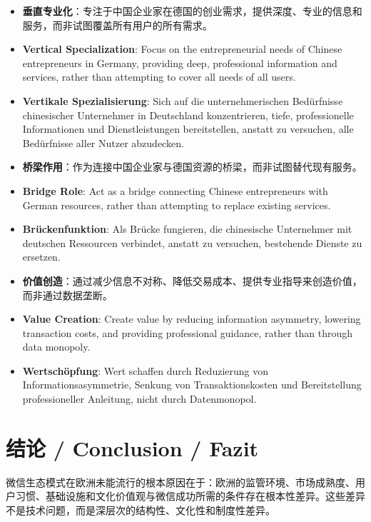 \documentclass[11pt,a4paper]{article}
\begin{document}
\begin{itemize}
    \item \textbf{垂直专业化}：专注于中国企业家在德国的创业需求，提供深度、专业的信息和服务，而非试图覆盖所有用户的所有需求。
    \item \textbf{Vertical Specialization}: Focus on the entrepreneurial needs of Chinese entrepreneurs in Germany, providing deep, professional information and services, rather than attempting to cover all needs of all users.
    \item \textbf{Vertikale Spezialisierung}: Sich auf die unternehmerischen Bedürfnisse chinesischer Unternehmer in Deutschland konzentrieren, tiefe, professionelle Informationen und Dienstleistungen bereitstellen, anstatt zu versuchen, alle Bedürfnisse aller Nutzer abzudecken.
    
    \item \textbf{桥梁作用}：作为连接中国企业家与德国资源的桥梁，而非试图替代现有服务。
    \item \textbf{Bridge Role}: Act as a bridge connecting Chinese entrepreneurs with German resources, rather than attempting to replace existing services.
    \item \textbf{Brückenfunktion}: Als Brücke fungieren, die chinesische Unternehmer mit deutschen Ressourcen verbindet, anstatt zu versuchen, bestehende Dienste zu ersetzen.
    
    \item \textbf{价值创造}：通过减少信息不对称、降低交易成本、提供专业指导来创造价值，而非通过数据垄断。
    \item \textbf{Value Creation}: Create value by reducing information asymmetry, lowering transaction costs, and providing professional guidance, rather than through data monopoly.
    \item \textbf{Wertschöpfung}: Wert schaffen durch Reduzierung von Informationsasymmetrie, Senkung von Transaktionskosten und Bereitstellung professioneller Anleitung, nicht durch Datenmonopol.
\end{itemize}

\section{结论 / Conclusion / Fazit}

微信生态模式在欧洲未能流行的根本原因在于：欧洲的监管环境、市场成熟度、用户习惯、基础设施和文化价值观与微信成功所需的条件存在根本性差异。这些差异不是技术问题，而是深层次的结构性、文化性和制度性差异。
\end{document}
